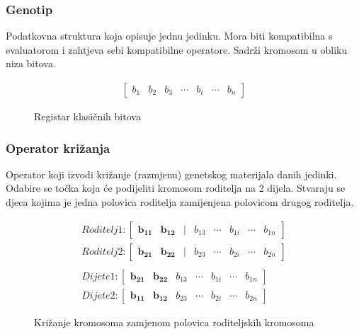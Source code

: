 \documentclass[times, utf8, zavrsni, numeric]{fer}
\begin{document}
\subsubsection{Genotip}
Podatkovna struktura koja opisuje jednu jedinku. Mora biti kompatibilna s evaluatorom i zahtjeva sebi kompatibilne operatore. Sadrži kromosom u obliku niza bitova.
\begin{figure}[htb]
\centering
\begin{align*}
\begin{bmatrix}
b_1 & b_2 & b_3 & \cdots & b_i & \cdots & b_n
\end{bmatrix}
\end{align*}
\caption{Registar klasičnih bitova}
\end{figure}

\subsubsection{Operator križanja}
Operator koji izvodi križanje (razmjenu) genetskog materijala danih jedinki. Odabire se točka koja će podijeliti kromosom roditelja na 2 dijela. Stvaraju se djeca kojima je jedna polovica roditelja zamijenjena polovicom drugog roditelja.
\begin{figure}[htb]
\centering
\begin{align*}
Roditelj 1:
\begin{bmatrix}
\mathbf{b_{11}} & \mathbf{b_{12}} & | & b_{13} & \cdots & b_{1i} & \cdots & b_{1n}
\end{bmatrix} \\
Roditelj 2:
\begin{bmatrix}
\mathbf{b_{21}} & \mathbf{b_{22}} & | & b_{23} & \cdots & b_{2i} & \cdots & b_{2n}
\end{bmatrix} \\\\
Dijete 1:
\begin{bmatrix}
\mathbf{b_{21}} & \mathbf{b_{22}} & b_{13} & \cdots & b_{1i} & \cdots & b_{1n}
\end{bmatrix} \\
Dijete 2:
\begin{bmatrix}
\mathbf{b_{11}} & \mathbf{b_{12}} & b_{23} & \cdots & b_{2i} & \cdots & b_{2n}
\end{bmatrix}
\end{align*}
\caption{Križanje kromosoma zamjenom polovica roditeljskih kromosoma}
\end{figure}
\end{document}
